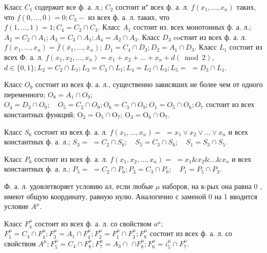 \documentclass[10pt]{article}
\begin{document}
Класс $C_{1}$ содержит все ф. а. л.; $C_{2}$ состоит и" всех ф. а. л. $f\left(x_{1}, \ldots, x_{n}\right)$ таких, что $f(0, \ldots, 0)=0 ; C_{3}-$ из всех ф. а. л. таких, что $f(1, \ldots, 1)=1 ; C_{4}=C_{2} \cap C_{3}$. Класс $A_{1}$ состоит из. всех монотонных ф. а. л.; $A_{2}=C_{2} \cap A_{1} ; A_{3}=C_{3} \cap A_{1} ; A_{4}=A_{2} \cap A_{3}$. Класс $D_{3}$ coстоит из всех ф. а. л. $f\left(x_{1}, \ldots, x_{n}\right)=\bar{f}\left(\bar{x}_{1}, \ldots, \bar{x}_{n}\right)$; $D_{1}=C_{4} \cap D_{3} ; D_{2}=A_{1} \cap D_{3}$. Класс $L_{1}$ состоит из всех Ф. а. л. $f\left(x_{1}, x_{2}, \ldots, x_{n}\right)=x_{1}+x_{2}+\ldots+x_{n}+d(\bmod 2)$, $d \in\{0,1\} ; L_{2}=C_{2} \cap L_{1} ; L_{3}=C_{3} \cap L_{1} ; L_{4}=L_{2} \cap L_{3} ; L_{5}=$ $=D_{3} \cap L_{1}$.



Класс $O_{9}$ состоит из всех ф. а. л., существенно зависяших не более чем от одного переменного; $O_{8}=A_{1} \cap O_{9}$; $O_{4}=D_{3} \cap O_{9} ; \quad O_{5}=C_{2} \cap O_{9} ; O_{6}=C_{3} \cap O_{9} ; O_{1}=O_{5} \cap O_{6} ; O_{7}$ состоит из всех константных функций; $\mathrm{O}_{2}=\mathrm{O}_{5} \cap \mathrm{O}_{7}$; $\mathrm{O}_{3}=\mathrm{O}_{6} \cap \mathrm{O}_{7}$.



Класс $S_{6}$ состоит из всех ф. а. л. $f\left(x_{1}, \ldots, x_{n}\right)=$ $=x_{1} \vee x_{2} \vee \ldots \vee x_{n}$ и всех константных ф. а. л.; $S_{3}=$ $=C_{2} \cap S_{6} ; \quad S_{5}=C_{3} \cap S_{6} ; \quad S_{1}=S_{3} \cap S_{5}$.



Класс $P_{6}$ состоит из всех ф. а. л. $f\left(x_{1}, x_{2}, \ldots, x_{n}\right)=$ $=x_{1} \& x_{2} \& \ldots \& x_{n}$ и всех константных ф. а. л.; $P_{5}=$ $=C_{2} \cap P_{6} ; P_{3}=C_{3} \cap P_{6} ; \quad P_{1}=P_{5} \cap P_{3}$.



Ф. а. л. удовлетворяет условию ал, если любые $\mu$ наборов, на к-рых она равна 0 , имеют общую координату, равную нулю. Аналогично с заменой 0 на 1 вводится условие $A^{\mu}$.



Класс $F_{4}^{\mu}$ состоит из всех ф. а. л. со свойством $a^{\mu}$; $F_{1}^{\mu}=C_{4} \cap F_{4}^{\mu} ; F_{3}^{\mu}=A_{1} \cap F_{4}^{\mu} ; F_{2}^{\mu}=F_{1}^{\mu} \cap F_{3}^{\mu} ; F_{8}^{\mu}$ состоит из всех ф. а. л. со свойством $A^{\mu} ; F_{5}^{\mu}=C_{4} \cap F_{8}^{\mu} ; F_{7}^{\mu}=A_{3} \cap$ $\cap F_{8}^{\mu} ; F_{6}^{\mu}=i_{5}^{\mu} \cap F_{7}^{\mu}$.
\end{document}
